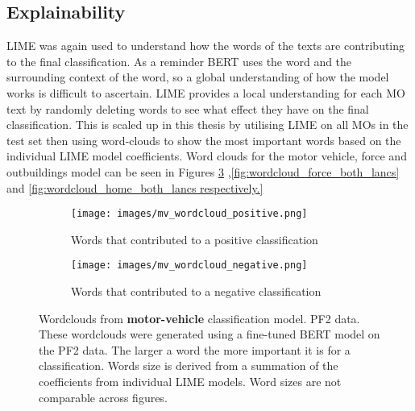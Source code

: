 \subsection{Explainability} LIME was again used to understand how the words of the texts are contributing to the final classification. As a reminder BERT uses the word and the surrounding context of the word, so a global understanding of how the model works is difficult to ascertain. LIME provides a local understanding for each MO text by randomly deleting words to see what effect they have on the final classification. This is scaled up in this thesis by utilising LIME on all MOs in the test set then using word-clouds to show the most important words based on the individual LIME model coefficients. Word clouds for the motor vehicle, force and outbuildings model can be seen in Figures \ref{fig:wordcloud_mv_both_lancs} ,\ref{fig:wordcloud_force_both_lancs} and \ref{fig:wordcloud_home_both_lancs respectively.}

\begin{figure}
     \centering
     \begin{subfigure}[b]{0.9\textwidth}
         \centering
         \texttt{[image: images/mv\_wordcloud\_positive.png]}
         \caption{Words that contributed to a positive classification}
         \label{fig: wordcloud_mv_lancs}
     \end{subfigure}
     \vfill
     \begin{subfigure}[b]{0.9\textwidth}
         \centering
         \texttt{[image: images/mv\_wordcloud\_negative.png]}
         \caption{Words that contributed to a negative classification}
         \label{fig: wordcloud_mv_rev_lancs}
     \end{subfigure}
        \caption[Wordclouds from  \textbf{motor-vehicle} classification model. PF2 data.]{{Wordclouds from  \textbf{motor-vehicle} classification model. PF2 data.} These wordclouds were generated using a fine-tuned BERT model on the PF2 data. The larger a word the more important it is for a classification. Words size is derived from a summation of the coefficients from individual LIME models. Word sizes are not comparable across figures.}
        \label{fig:wordcloud_mv_both_lancs}
        
\end{figure}


